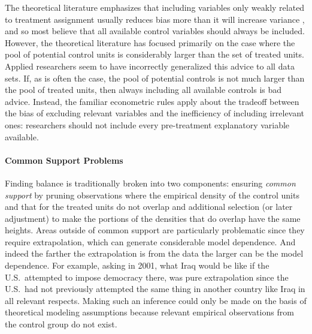 \documentclass[11pt,titlepage]{article}
\begin{document}
The theoretical literature emphasizes that including variables only
weakly related to treatment assignment usually reduces bias more than
it will increase variance \citep{RubTho96, HecIchSmi98}, and so most
believe that all available control variables should always be
included.  However, the theoretical literature has focused primarily
on the case where the pool of potential control units is considerably
larger than the set of treated units.  Applied researchers seem to
have incorrectly generalized this advice to all data sets.  If, as is
often the case, the pool of potential controls is not much larger than
the pool of treated units, then always including all available
controls is bad advice.  Instead, the familiar econometric rules apply
about the tradeoff between the bias of excluding relevant variables
and the inefficiency of including irrelevant ones: researchers should
not include every pre-treatment explanatory variable available.

\paragraph{Common Support Problems}

Finding balance is traditionally broken into two components: ensuring
\emph{common support} by pruning observations where the empirical
density of the control units and that for the treated units do not
overlap and additional selection (or later adjustment) to make the
portions of the densities that do overlap have the same heights.
Areas outside of common support are particularly problematic since
they require extrapolation, which can generate considerable model
dependence.  And indeed the farther the extrapolation is from the data
the larger can be the model dependence.  For example, asking in 2001,
what Iraq would be like if the U.S.\ attempted to impose democracy
there, was pure extrapolation since the U.S.\ had not previously
attempted the same thing in another country like Iraq in all relevant
respects.  Making such an inference could only be made on the basis of
theoretical modeling assumptions because relevant empirical
observations from the control group do not exist.
\end{document}

